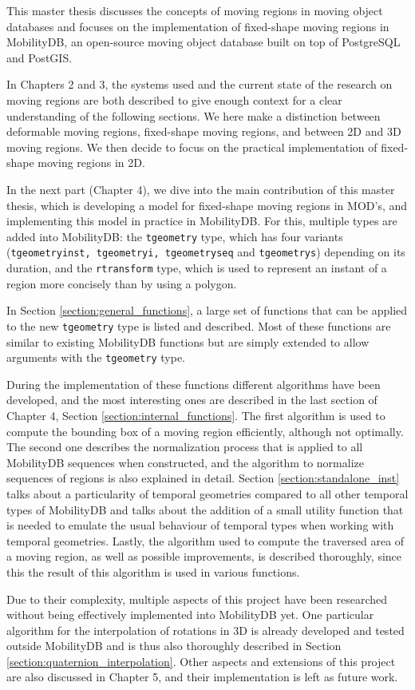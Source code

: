 \label{section:summary}

This master thesis discusses the concepts of moving regions in moving object databases and focuses on the implementation of fixed-shape moving regions in MobilityDB, an open-source moving object database built on top of PostgreSQL and PostGIS.

In Chapters 2 and 3, the systems used and the current state of the research on moving regions are both described to give enough context for a clear understanding of the following sections. We here make a distinction between deformable moving regions, fixed-shape moving regions, and between 2D and 3D moving regions. We then decide to focus on the practical implementation of fixed-shape moving regions in 2D.

In the next part (Chapter 4), we dive into the main contribution of this master thesis, which is developing a model for fixed-shape moving regions in MOD's, and implementing this model in practice in MobilityDB. For this, multiple types are added into MobilityDB: the \lstinline{tgeometry} type, which has four variants (\lstinline{tgeometryinst, tgeometryi, tgeometryseq} and \lstinline{tgeometrys}) depending on its duration, and the \lstinline{rtransform} type, which is used to represent an instant of a region more concisely than by using a polygon.

In Section \ref{section:general_functions}, a large set of functions that can be applied to the new \lstinline{tgeometry} type is listed and described. Most of these functions are similar to existing MobilityDB functions but are simply extended to allow arguments with the \lstinline{tgeometry} type.

During the implementation of these functions different algorithms have been developed, and the most interesting ones are described in the last section of Chapter 4, Section \ref{section:internal_functions}. The first algorithm is used to compute the bounding box of a moving region efficiently, although not optimally. The second one describes the normalization process that is applied to all MobilityDB sequences when constructed, and the algorithm to normalize sequences of regions is also explained in detail. Section \ref{section:standalone_inst} talks about a particularity of temporal geometries compared to all other temporal types of MobilityDB and talks about the addition of a small utility function that is needed to emulate the usual behaviour of temporal types when working with temporal geometries. Lastly, the algorithm used to compute the traversed area of a moving region, as well as possible improvements,  is described thoroughly, since this the result of this algorithm is used in various functions.

Due to their complexity, multiple aspects of this project have been researched without being effectively implemented into MobilityDB yet. One particular algorithm for the interpolation of rotations in 3D is already developed and tested outside MobilityDB and is thus also thoroughly described in Section \ref{section:quaternion_interpolation}. Other aspects and extensions of this project are also discussed in Chapter 5, and their implementation is left as future work.